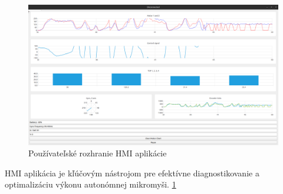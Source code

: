 \begin{figure}[!htpb]
	\centering
	\includegraphics[width=14cm]{includes//images/image.png}
	\caption{Používateľské rozhranie HMI aplikácie }
	\label{fig:UDP}
\end{figure}

HMI aplikácia je kľúčovým nástrojom pre efektívne diagnostikovanie a optimalizáciu výkonu autonómnej mikromyši. \ref{fig:UDP} 
